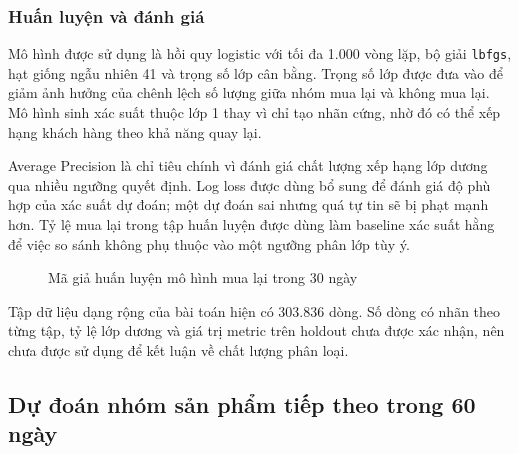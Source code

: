 \subsubsection{Huấn luyện và đánh giá}

Mô hình được sử dụng là hồi quy logistic với tối đa 1.000 vòng lặp, bộ giải \texttt{lbfgs}, hạt giống ngẫu nhiên 41 và trọng số lớp cân bằng. Trọng số lớp được đưa vào để giảm ảnh hưởng của chênh lệch số lượng giữa nhóm mua lại và không mua lại. Mô hình sinh xác suất thuộc lớp 1 thay vì chỉ tạo nhãn cứng, nhờ đó có thể xếp hạng khách hàng theo khả năng quay lại.

Average Precision là chỉ tiêu chính vì đánh giá chất lượng xếp hạng lớp dương qua nhiều ngưỡng quyết định. Log loss được dùng bổ sung để đánh giá độ phù hợp của xác suất dự đoán; một dự đoán sai nhưng quá tự tin sẽ bị phạt mạnh hơn. Tỷ lệ mua lại trong tập huấn luyện được dùng làm baseline xác suất hằng để việc so sánh không phụ thuộc vào một ngưỡng phân lớp tùy ý.

\begin{figure}[H]\centering
{}
\caption{Mã giả huấn luyện mô hình mua lại trong 30 ngày}
\label{fig:pseudo-repeat-30d}
\end{figure}

Tập dữ liệu dạng rộng của bài toán hiện có 303.836 dòng. Số dòng có nhãn theo từng tập, tỷ lệ lớp dương và giá trị metric trên holdout chưa được xác nhận, nên chưa được sử dụng để kết luận về chất lượng phân loại.

\subsection{Dự đoán nhóm sản phẩm tiếp theo trong 60 ngày}

